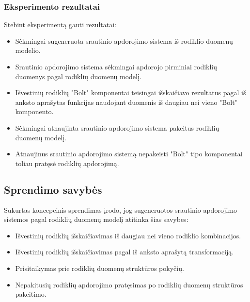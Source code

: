 \documentclass{VUMIFPSbakalaurinis}
\begin{document}
\subsubsection{Eksperimento rezultatai}
Stebint eksperimentą gauti rezultatai:
\begin{itemize}
    \item Sėkmingai sugeneruota srautinio apdorojimo sistema iš rodiklio duomenų modelio.
    \item Srautinio apdorojimo sistema sėkmingai apdorojo pirminiai rodiklių duomenys pagal rodiklių duomenų modelį.
    \item Išvestinių rodiklių "Bolt" komponentai teisingai išskaičiavo rezultatus pagal iš anksto aprašytas funkcijas naudojant duomenis iš daugiau nei vieno "Bolt" komponento.
    \item Sėkmingai atnaujinta srautinio apdorojimo sistema pakeitus rodiklių duomenų modelį.
    \item Atnaujinus srautinio apdorojimo sistemą nepakeisti "Bolt" tipo komponentai toliau pratęsė rodiklių apdorojimą. 
\end{itemize}
\subsection{Sprendimo savybės}

Sukurtas koncepcinis sprendimas įrodo, jog sugeneruotos srautinio apdorojimo sistemos pagal rodiklių duomenų modelį atitinka šias savybes:
\begin{itemize}
    \item Išvestinių rodiklių išskaičiavimas iš daugiau nei vieno rodiklio kombinacijos.
    \item Išvestinių rodiklių išskaičiavimas pagal iš anksto aprašytą transformaciją.
    \item Prisitaikymas prie rodiklių duomenų struktūros pokyčių. 
    \item Nepakitusių rodiklių apdorojimo pratęsimas po rodiklių duomenų struktūros pakeitimo.
\end{itemize} 

\end{document}
